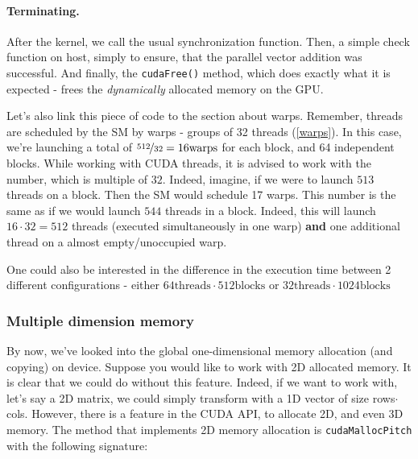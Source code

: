 \documentclass[12pt]{article}
\begin{document}
\vspace{-0.8cm}
\paragraph{Terminating.} After the kernel, we call the usual synchronization function. 
Then, a simple check function on host, simply to ensure, that the parallel vector addition was successful.
And finally, the \verb|cudaFree()| method, which does exactly what it is expected - 
frees the \textit{dynamically} allocated memory on the GPU.

Let's also link this piece of code to the section about warps. Remember, 
threads are scheduled by the SM by warps - groups of 32 threads (\autoref{warps}). 
In this case, we're launching a total of $\nicefrac{512}{32} = 16 \text{warps}$ for each 
block, and 64 independent blocks. While working with CUDA threads, it is advised to work with 
the number, which is multiple of $32$. Indeed, imagine, if we were to launch $513$ threads on a block.
Then the SM would schedule 17 warps. This number is the same as if we would launch $544$ threads in a block.
Indeed, this will launch $16\cdot 32 = 512$ threads (executed simultaneously in one warp) \textbf{and} 
one additional thread on a almost empty/unoccupied warp. 

One could also be interested in the difference in the execution time between 2 different
 configurations - either $64\text{threads}\cdot 512\text{blocks}$ or $32\text{threads}\cdot 1024\text{blocks}$

\subsubsection{Multiple dimension memory}
By now, we've looked into the global one-dimensional 
memory allocation (and copying) on device. Suppose you would like to work 
with 2D allocated memory. It is clear that we could do without this feature. 
Indeed, if we want to work with, let's say a 2D matrix, we could simply 
transform with a 1D vector of size rows$\cdot$cols.
However, there is a feature in the CUDA API, to allocate 2D, and even 
3D memory\cite{MemoryAlignment}. 
The method that implements 2D memory allocation is \verb|cudaMallocPitch| with the following signature:
\end{document}
